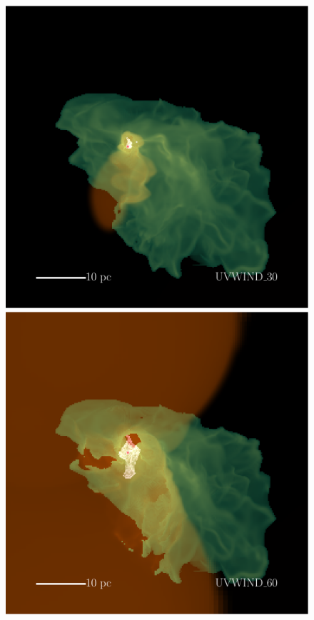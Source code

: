 \documentclass[a4paper,fleqn,usenatbib]{mnras}
\begin{document}
\begin{figure}
	\includegraphics[width=0.99\columnwidth]{../plots/vis/multiray/multirayTime_coolemission_ionemission_xrayemission2__windset_30Msun0p2Myr_zoom0p5__ywindonly.pdf} \includegraphics[width=0.99\columnwidth]{../plots/vis/multiray/multirayTime_coolemission_ionemission_xrayemission2__windset_60Msun0p2Myr_zoom0p5__ywindonly.pdf}

\end{figure}
\end{document}
